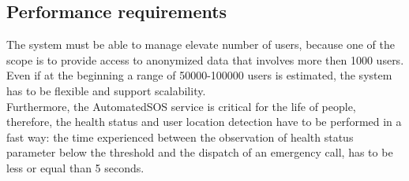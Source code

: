 \subsection{Performance requirements}
The system must be able to manage elevate number of users, because one of the scope is to provide access to anonymized data that involves more then 1000 users. Even if at the beginning a range of 50000-100000 users is estimated, the system has to be flexible and support scalability. \\
Furthermore, the AutomatedSOS service is critical for the life of people, therefore, the health status and user location detection have to be performed in a fast way: the time experienced between the observation of health status parameter below the threshold and the dispatch of an emergency call, has to be less or equal than 5 seconds.  